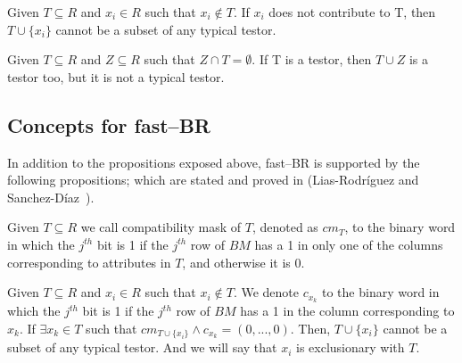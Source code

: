 \documentclass[citeauthoryear]{llncs}
\begin{document}
	\begin{proposition}\label{prop:contrib} 
		Given $T \subseteq R$ and  $x_i \in R$ such that $x_i \notin T$. If $x_i$ does not contribute to T, then 		$T\cup\{x_i\}$ cannot be a subset of any typical testor.
	\end{proposition}

	\begin{proposition}\label{prop:superset} 
		Given $T \subseteq R$ and $Z \subseteq R$ such that $Z \cap T = \emptyset$. If T is a testor, then $T \cup Z$ is a 	testor too, but it is not a typical testor.
	\end{proposition}

%
\subsection{Concepts for fast--BR}
%
	In addition to the propositions exposed above, fast--BR is supported by the following propositions; which are stated and proved in (Lias-Rodr\'iguez and Sanchez-D\'iaz~\cite{Lias2013}).

%	
	
	\begin{definition}\label{def:exclusion}
		Given $T \subseteq R$ we call compatibility mask of $T$, denoted as $cm_T$, to the binary word in which the $j^{\mathit{th}}$ bit is 1 if the $j^{\mathit{th}}$ row of $BM$ has a 1 in only one of the columns corresponding to attributes in $T$, and otherwise it is 0.
	\end{definition}
	
	\begin{proposition}\label{prop:exclude} 
		Given $T \subseteq R$ and $x_i \in R$ such that $x_i \notin T$.	We denote $c_{x_k}$ to the binary word in which the $j^{\mathit{th}}$ bit is 1 if the $j^{\mathit{th}}$ row of $BM$ has a 1 in the column corresponding to $x_k$. If $\exists x_k \in T$ such that $cm_{T \cup \lbrace x_i\rbrace} \wedge c_{x_k}=(0,...,0)$. Then, $T \cup \lbrace x_i\rbrace$ cannot be a subset of any typical testor. And we will say that $x_i$ is exclusionary with $T$.
	\end{proposition}
	
\end{document}
